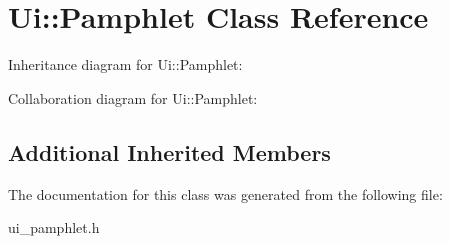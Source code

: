 \section{Ui\+:\+:Pamphlet Class Reference}
\label{class_ui_1_1_pamphlet}


Inheritance diagram for Ui\+:\+:Pamphlet\+:


Collaboration diagram for Ui\+:\+:Pamphlet\+:
\subsection*{Additional Inherited Members}


The documentation for this class was generated from the following file\+:\begin{DoxyCompactItemize}
\item 
ui\+\_\+pamphlet.\+h\end{DoxyCompactItemize}
